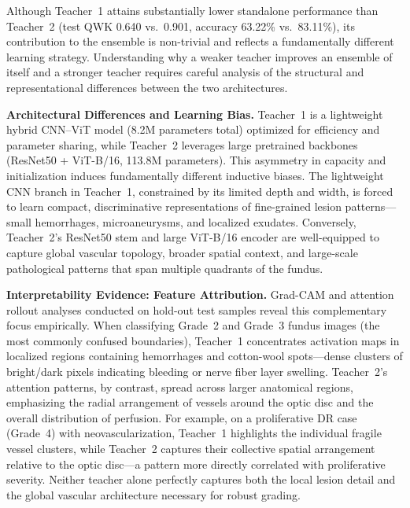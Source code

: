 \documentclass[a4paper,fleqn]{cas-dc}
\begin{document}
Although Teacher~1 attains substantially lower standalone performance than Teacher~2 (test QWK 0.640 vs.~0.901, accuracy 63.22\% vs.~83.11\%), its contribution to the ensemble is non-trivial and reflects a fundamentally different learning strategy. Understanding why a weaker teacher improves an ensemble of itself and a stronger teacher requires careful analysis of the structural and representational differences between the two architectures.

\textbf{Architectural Differences and Learning Bias.} Teacher~1 is a lightweight hybrid CNN--ViT model (8.2M parameters total) optimized for efficiency and parameter sharing, while Teacher~2 leverages large pretrained backbones (ResNet50 + ViT-B/16, 113.8M parameters). This asymmetry in capacity and initialization induces fundamentally different inductive biases. The lightweight CNN branch in Teacher~1, constrained by its limited depth and width, is forced to learn compact, discriminative representations of fine-grained lesion patterns---small hemorrhages, microaneurysms, and localized exudates. Conversely, Teacher~2's ResNet50 stem and large ViT-B/16 encoder are well-equipped to capture global vascular topology, broader spatial context, and large-scale pathological patterns that span multiple quadrants of the fundus.

\textbf{Interpretability Evidence: Feature Attribution.} Grad-CAM and attention rollout analyses conducted on hold-out test samples reveal this complementary focus empirically. When classifying Grade~2 and Grade~3 fundus images (the most commonly confused boundaries), Teacher~1 concentrates activation maps in localized regions containing hemorrhages and cotton-wool spots---dense clusters of bright/dark pixels indicating bleeding or nerve fiber layer swelling. Teacher~2's attention patterns, by contrast, spread across larger anatomical regions, emphasizing the radial arrangement of vessels around the optic disc and the overall distribution of perfusion. For example, on a proliferative DR case (Grade~4) with neovascularization, Teacher~1 highlights the individual fragile vessel clusters, while Teacher~2 captures their collective spatial arrangement relative to the optic disc---a pattern more directly correlated with proliferative severity. Neither teacher alone perfectly captures both the local lesion detail and the global vascular architecture necessary for robust grading.
\end{document}
